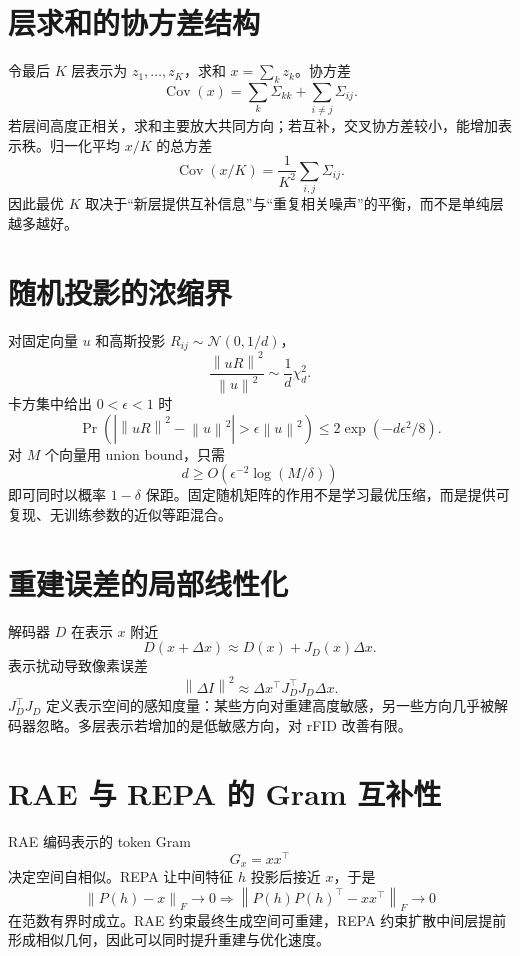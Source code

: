 \documentclass[UTF8,12pt,a4paper,fontset=none]{ctexart}
\numberwithin{equation}{section}
\newcommand{\norm}[1]{\left\lVert #1\right\rVert}
\begin{document}
\section{层求和的协方差结构}
令最后 $K$ 层表示为 $z_1,\ldots,z_K$，求和 $x=\sum_kz_k$。协方差
\begin{equation}
 \operatorname{Cov}(x)=\sum_k\Sigma_{kk}+\sum_{i\ne j}\Sigma_{ij}.
\end{equation}
若层间高度正相关，求和主要放大共同方向；若互补，交叉协方差较小，能增加表示秩。归一化平均 $x/K$ 的总方差
\begin{equation}
 \operatorname{Cov}(x/K)=\frac1{K^2}\sum_{i,j}\Sigma_{ij}.
\end{equation}
因此最优 $K$ 取决于“新层提供互补信息”与“重复相关噪声”的平衡，而不是单纯层越多越好。

\section{随机投影的浓缩界}
对固定向量 $u$ 和高斯投影 $R_{ij}\sim\mathcal N(0,1/d)$，
\begin{equation}
 \frac{\norm{uR}^2}{\norm u^2}
 \sim\frac1d\chi_d^2.
\end{equation}
卡方集中给出 $0<\epsilon<1$ 时
\begin{equation}
 \Pr\left(
 |\norm{uR}^2-\norm u^2|>\epsilon\norm u^2
 \right)\le2\exp(-d\epsilon^2/8).
\end{equation}
对 $M$ 个向量用 union bound，只需
\begin{equation}
 d\ge O(\epsilon^{-2}\log(M/\delta))
\end{equation}
即可同时以概率 $1-\delta$ 保距。固定随机矩阵的作用不是学习最优压缩，而是提供可复现、无训练参数的近似等距混合。

\section{重建误差的局部线性化}
解码器 $D$ 在表示 $x$ 附近
\begin{equation}
 D(x+\Delta x)\approx D(x)+J_D(x)\Delta x.
\end{equation}
表示扰动导致像素误差
\begin{equation}
 \norm{\Delta I}^2\approx
 \Delta x^\top J_D^\top J_D\Delta x.
\end{equation}
$J_D^\top J_D$ 定义表示空间的感知度量：某些方向对重建高度敏感，另一些方向几乎被解码器忽略。多层表示若增加的是低敏感方向，对 rFID 改善有限。

\section{RAE 与 REPA 的 Gram 互补性}
RAE 编码表示的 token Gram
\begin{equation}
 G_x=xx^\top
\end{equation}
决定空间自相似。REPA 让中间特征 $h$ 投影后接近 $x$，于是
\begin{equation}
 \norm{P(h)-x}_F\to0
 \Rightarrow
 \norm{P(h)P(h)^\top-xx^\top}_F\to0
\end{equation}
在范数有界时成立。RAE 约束最终生成空间可重建，REPA 约束扩散中间层提前形成相似几何，因此可以同时提升重建与优化速度。
\end{document}
